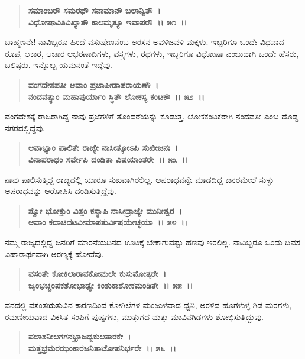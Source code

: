 \begin{verse}
\textbf{ಸಮಾಂಬರೌ ಸಮರಥೌ ಸನಾಮಾನೌ ಬಲಾನ್ವಿತೌ~।}\\\textbf{ವಿಧೋಷಾವಿತಿವಿಖ್ಯಾತೌ ಕಾಲಮೃತ್ಯೂ ಇವಾಪರೌ‌~।। ೫೧~।। }
\end{verse}

ಬಾಹ್ಮಣನೇ! ನಾವಿಬ್ಬರೂ ಹಿಂದೆ ವಸುಷೇಣನೆಂಬ ಅರಸನ ಅವಳಿಜವಳಿ ಮಕ್ಕಳು. ಇಬ್ಬರಿಗೂ ಒಂದೇ ವಿಧವಾದ ರೂಪ, ಆಕಾರ, ಆಚಾರ ಆಭರಣಾದಿಗಳು, ವಸ್ತ್ರಗಳು, ರಥಗಳು, ಇಬ್ಬರಿಗೂ ವಿಧೋಷಾ ಎಂಬುದಾಗಿ ಒಂದೇ ಹೆಸರು, ಬಲಿಷ್ಠರು. ಇನ್ನೊಬ್ಬ ಯಮನಂತೆ ಇದ್ದೆವು.

\begin{verse}
\textbf{ವಂಗದೇಶಪತೀ ಆವಾಂ ಪ್ರಜಾಪೀಡಾಪರಾಯಣೌ~।}\\\textbf{ನಂದವತ್ಯಾಂ ಮಹಾಪುರ್ಯಾಂ ಸ್ಥಿತೌ ಲೋಕಸ್ಯ ಕಂಟಕೌ~।। ೫೨~।।} 
\end{verse}

ವಂಗದೇಶಕ್ಕೆ ರಾಜರಾಗಿದ್ದ ನಾವು ಪ್ರಜೆಗಳಿಗೆ ತೊಂದರೆಯನ್ನು ಕೊಡುತ್ತ, ಲೋಕಕಂಟಕರಾಗಿ ನಂದವತೀ ಎಂಬ ದೊಡ್ಡ ನಗರದಲ್ಲಿದ್ದೆವು.

\begin{verse}
\textbf{ಆವಾಭ್ಯಾಂ ಪಾಲಿತೇ ರಾಜ್ಯೇ ನಾಸೀತ್ಕೋಽಪಿ ಸುಖೀಜನಃ~।}\\\textbf{ವಿನಾಪರಾಧಂ ಸರ್ವೇಪಿ ದಂಡಿತಾ ವಿಷಯಾಂತರೇ~।। ೫೩~।। }
\end{verse}

ನಾವು ಪಾಲಿಸುತ್ತಿದ್ದ ರಾಜ್ಯದಲ್ಲಿ ಯಾರೂ ಸುಖವಾಗಿರಲಿಲ್ಲ. ಅಪರಾಧವನ್ನೇ ಮಾಡದಿದ್ದ ಜನರಮೇಲೆ ಸುಳ್ಳು ಅಪರಾಧವನ್ನು ಆರೋಪಿಸಿ ದಂಡಿಸುತ್ತಿದ್ದೆವು.

\begin{verse}
\textbf{ಶ್ವೋ ಭೋಕ್ತುಂ ವಿತ್ತಂ ಕಸ್ಯಾಪಿ ನಾಸೀದ್ರಾಜ್ಯೇ ಮುನೀಶ್ವರ~।}\\\textbf{ಆವಾಂ ಕದಾಚಿದಟವೀಮಾಪತುರ್ವಿಷಯೇಚ್ಛಯಾ~।। ೫೪~।। }
\end{verse}

ನಮ್ಮ ರಾಜ್ಯದಲ್ಲಿದ್ದ ಜನರಿಗೆ ಮಾರನೆಯದಿನದ ಊಟಕ್ಕೆ ಬೇಕಾಗುವಷ್ಟು ಹಣವು ಇರಲಿಲ್ಲ. ನಾವಿಬ್ಬರೂ ಒಂದು ದಿವಸ ವಿಹಾರಾರ್ಥವಾಗಿ ಅರಣ್ಯಕ್ಕೆ ಹೋದೆವು.

\begin{verse}
\textbf{ವಸಂತೇ ಕೋಕಿಲಾರಾವಕೋಮಲೇ ಕುಸುಮೋತ್ಕರೇ~।}\\\textbf{ಜೃಂಭಚ್ಚಂಪಕಶೋಭಾಢ್ಯೇ ಕಿಂಶುಕಾಶೋಕಮಂಡಿತೇ~।। ೫೫~।। }
\end{verse}

ವನದಲ್ಲಿ ವಸಂತಋತುವಿನ ಕಾರಣದಿಂದ ಕೋಗಿಲೆಗಳ ಮಂಜುಳವಾದ ಧ್ವನಿ, ಅರಳಿದ ಹೂಗಳುಳ್ಳ ಗಿಡ-ಮರಗಳು, ರಮಣೀಯವಾದ ವಿಕಸಿತ ಸಂಪಿಗೆ ಪುಷ್ಪಗಳು, ಮುತ್ತುಗದ ಮತ್ತು ಮಾವಿನಗಿಡಗಳು ಶೋಭಿಸುತ್ತಿದ್ದುವು.

\begin{verse}
\textbf{ಪಲಾಶನೀಲಗಗನಭ್ರಾಜದ್ಬಕುಲತಾರಕೇ~।}\\\textbf{ಮತ್ತಭ್ರಮರಝಂಕಾರಜನಿತಾಟೋಪನಿರ್ಭರೇ~।। ೫೬~।।} 
\end{verse}

